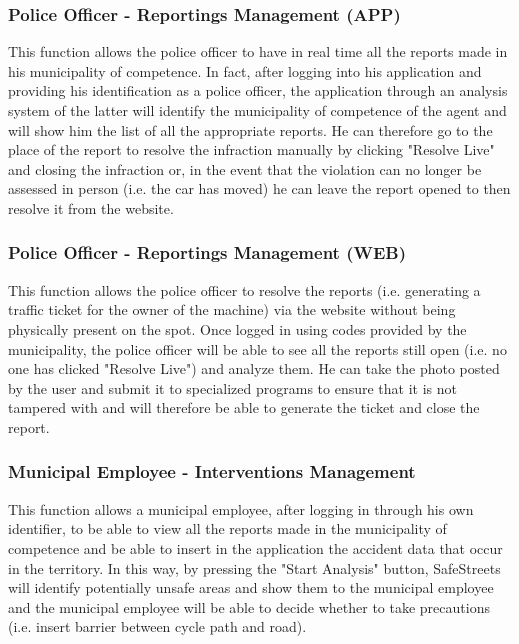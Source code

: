 \documentclass{article}
\begin{document}
    \subsubsection{Police Officer - Reportings Management (APP)}
    This function allows the police officer to have in real time all the reports
    made in his municipality of competence. In fact, after logging into his
    application and providing his identification as a police officer, the
    application through an analysis system of the latter will identify the
    municipality of competence of the agent and will show him the list of all
    the appropriate reports. He can therefore go to the place of the report to
    resolve the infraction manually by clicking "Resolve Live" and closing the
    infraction or, in the event that the violation can no longer be assessed in
    person (i.e. the car has moved) he can leave the report opened to then
    resolve it from the website.

    \subsubsection{Police Officer - Reportings Management (WEB)}
    This function allows the police officer to resolve the reports (i.e.
    generating a traffic ticket for the owner of the machine) via the website
    without being physically present on the spot. Once logged in using codes
    provided by the municipality, the police officer will be able to see all the
    reports still open (i.e. no one has clicked "Resolve Live") and analyze
    them. He can take the photo posted by the user and submit it to specialized
    programs to ensure that it is not tampered with and will therefore be able
    to generate the ticket and close the report.

    \subsubsection{Municipal Employee - Interventions Management}
    This function allows a municipal employee, after logging in through his own
    identifier, to be able to view all the reports made in the municipality of
    competence and be able to insert in the application the accident data that
    occur in the territory. In this way, by pressing the "Start Analysis"
    button, SafeStreets will identify potentially unsafe areas and show them to
    the municipal employee and the municipal employee will be able to decide
    whether to take precautions (i.e. insert barrier between cycle path and
    road).
\end{document}
